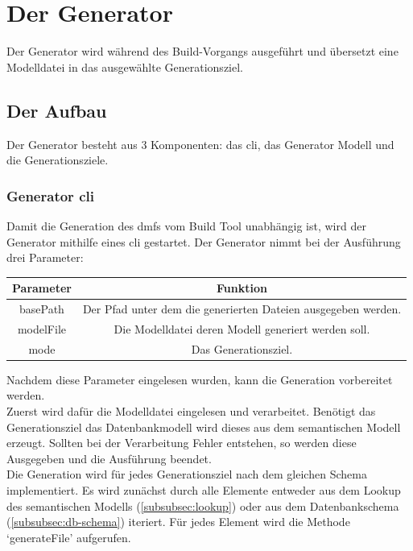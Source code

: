\documentclass[./einleitung.tex]{subfiles}
\begin{document}
    \section{Der Generator}\label{sec:der-generator}
    Der Generator wird während des Build-Vorgangs ausgeführt und übersetzt eine Modelldatei in das ausgewählte Generationsziel.
    \subsection{Der Aufbau}
    Der Generator besteht aus 3 Komponenten: das \acrfull{cli}, das Generator Modell und die Generationsziele.
    \subsubsection{Generator \acrshort{cli}}\label{subsubsec:generator-cli}
    Damit die Generation des \acrshort{dmf}s vom Build Tool unabhängig ist, wird der Generator mithilfe eines \acrshort{cli} gestartet.
    Der Generator nimmt bei der Ausführung drei Parameter:
    \begin{center}
        \begin{tabular}{|c|c|}
            \hline
            Parameter & Funktion\\
            \hline
            basePath & Der Pfad unter dem die generierten Dateien ausgegeben werden.\\
            \hline
            modelFile & Die Modelldatei deren Modell generiert werden soll.\\
            \hline
            mode & Das Generationsziel.\\
            \hline
        \end{tabular}
    \end{center}
    Nachdem diese Parameter eingelesen wurden, kann die Generation vorbereitet werden.\\
    Zuerst wird dafür die Modelldatei eingelesen und verarbeitet.
    Benötigt das Generationsziel das Datenbankmodell wird dieses aus dem semantischen Modell erzeugt.
    Sollten bei der Verarbeitung Fehler entstehen, so werden diese Ausgegeben und die Ausführung beendet.\\
    Die Generation wird für jedes Generationsziel nach dem gleichen Schema implementiert.
    Es wird zunächst durch alle Elemente entweder aus dem Lookup des semantischen Modells (\ref{subsubsec:lookup}) oder aus dem Datenbankschema (\ref{subsubsec:db-schema}) iteriert.
    Für jedes Element wird die Methode `generateFile' aufgerufen.
\end{document}
